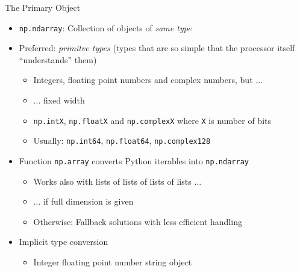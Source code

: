 \begin{frame}[fragile]{The Primary Object}
%
\begin{itemize}
\item \texttt{np.ndarray}: Collection of objects of \emph{same type}
\item Preferred: \emph{primitve types} (types that are so simple that the processor itself \enquote{understands} them)
	\begin{itemize}
	\item Integers, floating point numbers and complex numbers, but ...
	\item ... fixed width
	\item \texttt{np.intX}, \texttt{np.floatX} and \texttt{np.complexX} where \texttt{X} is number of bits
	\item Usually: \texttt{np.int64}, \texttt{np.float64}, \texttt{np.complex128}
	\end{itemize}
\item Function \texttt{np.array} converts Python iterables into \texttt{np.ndarray}
	\begin{itemize}
	\item Works also with lists of lists of lists of lists ...
	\item ... if full dimension is given
	\item Otherwise: Fallback solutions with less efficient handling
	\end{itemize}
\item Implicit type conversion
	\begin{itemize}
	\item Integer \thus floating point number \thus string \thus object
	\end{itemize}
\end{itemize}
%
\end{frame}


